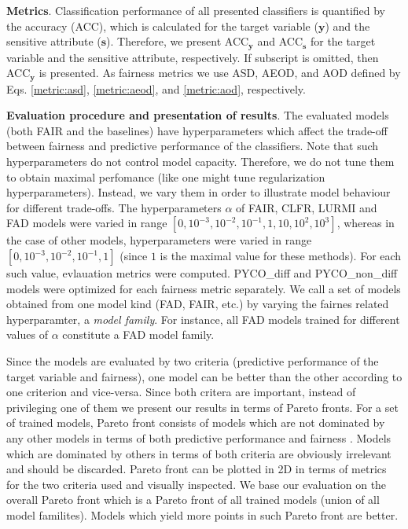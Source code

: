 \documentclass[preprint,12pt]{elsarticle}
\begin{document}
\textbf{Metrics}.
Classification performance of all presented classifiers is quantified by the accuracy (ACC), which is calculated for the target variable ($\mathbf{y}$) and the sensitive attribute ($\mathbf{s}$). Therefore, we present ACC$_\mathbf{y}$ and ACC$_\mathbf{s}$ for the target variable and the sensitive attribute, respectively. If subscript is omitted, then ACC$_\mathbf{y}$ is presented. As fairness metrics we use ASD, AEOD, and AOD defined by Eqs. \ref{metric:asd}, \ref{metric:aeod}, and \ref{metric:aod}, respectively. 

\textbf{Evaluation procedure and presentation of results}. The evaluated models (both FAIR and the baselines) have hyperparameters which affect the trade-off between fairness and predictive performance of the classifiers. Note that such hyperparameters do not control model capacity. Therefore, we do not tune them to obtain maximal perfomance (like one might tune regularization hyperparameters). Instead, we vary them in order to illustrate model behaviour for different trade-offs. The hyperparameters $\alpha$ of FAIR, CLFR, LURMI and FAD models were varied in range $[0, 10^{-3}, 10^{-2}, 10^{-1}, 1, 10, 10^{2}, 10^{3}]$, whereas in the case of other models, hyperparameters were varied in range $[0, 10^{-3}, 10^{-2}, 10^{-1}, 1]$ (since $1$ is the maximal value for these methods). For each such value, evlauation metrics were computed. PYCO\_diff and PYCO\_non\_diff models were optimized for each fairness metric separately. We call a set of models obtained from one model kind (FAD, FAIR, etc.) by varying the fairnes related hyperparamter, a {\em model family}. For instance, all FAD models trained for different values of $\alpha$ constitute a FAD model family.

Since the models are evaluated by two criteria (predictive performance of the target variable and fairness), one model can be better than the other according to one criterion and vice-versa. Since both critera are important, instead of privileging one of them we present our results in terms of Pareto fronts. For a set of trained models, Pareto front consists of models which are not dominated by any other models in terms of both predictive performance and fairness \cite{marler2004survey}. Models which are dominated by others in terms of both criteria are obviously irrelevant and should be discarded. Pareto front can be plotted in 2D in terms of metrics for the two criteria used and visually inspected. We base our evaluation on the overall Pareto front which is a Pareto front of all trained models (union of all model familites). Models which yield more points in such Pareto front are better.
\end{document}
